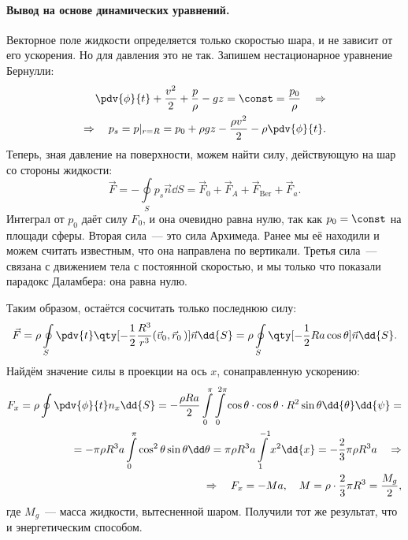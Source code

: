 \paragraph{Вывод на основе динамических уравнений. } Векторное поле жидкости определяется только скоростью шара, и не зависит от его ускорения.
Но для давления это не так.
Запишем нестационарное уравнение Бернулли:
\begin{equation}
    \begin{aligned}
    \pdv{\phi}{t}+\frac{v^2}{2} + \frac{p}{\rho} - gz = \const =
        \frac{p_0}{\rho}
        \quad\Rightarrow\\
        \Rightarrow \quad p_s = p |_{r=R} = p_0 +\rho g z -\frac{\rho v^2}{2} - \rho\pdv{\phi}{t}.
    \end{aligned}
\end{equation}
Теперь, зная давление на поверхности, можем найти силу, действующую на шар со стороны жидкости:
\begin{equation}
    \vec{F} = -\oint\limits_S p_s \vec{n} \dd{S}=
    \vec{F}_0 + \vec{F}_A + \vec{F}_\text{Ber} + \vec{F}_a.
\end{equation}
Интеграл от $p_0$ даёт силу $F_0$, и она очевидно равна нулю, так как $p_0=\const$ на площади сферы.
Вторая сила~--- это сила Архимеда. Ранее мы её находили и можем считать известным, что она направлена по вертикали.
Третья сила~--- связана с движением тела с постоянной скоростью, и мы только что показали парадокс Даламбера: она равна нулю.

Таким образом, остаётся сосчитать только последнюю силу:
\begin{equation}
    \vec{F} = \rho\oint\limits_S \pdv{t}\qty[
    -\frac{1}{2} \frac{R^3}{r^3} (\vec{v}_0,\vec{r}_0\,)
    ]\vec{n} \dd{S} =
    \rho\oint\limits_S \qty[
    -\frac{1}{2} R a\cos\theta
    ] \vec{n} \dd{S}.
\end{equation}
Найдём значение силы в проекции на ось $x$, сонаправленную ускорению:
\begin{equation}
    \begin{aligned}
        F_x = \rho\oint\pdv{\phi}{t}n_x \dd{S} =
        -\frac{\rho R a}{2} \int\limits_0^\pi \int\limits_0^{2\pi}
        \cos\theta \cdot \cos\theta \cdot R^2\sin\theta \dd{\theta} \dd{\psi}=\\=
        -\pi\rho R^3 a \int\limits_0^\pi \cos^2\theta \sin \theta \dd\theta=
        \pi\rho R^3 a \int\limits_{1}^{-1} x^2 \dd{x} = -\frac{2}{3}\pi\rho R^3 a
        \quad\Rightarrow \\
        \Rightarrow\quad
        F_x = -Ma, \quad M = \rho\cdot \frac{2}{3}\pi R^3 = \frac{M_g}{2},
    \end{aligned}
\end{equation}
где $M_g$~--- масса жидкости, вытесненной шаром.
Получили тот же результат, что и энергетическим способом.

